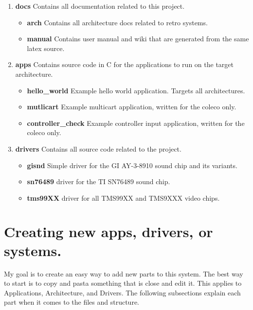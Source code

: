\documentclass{article}
\begin{document}
  \begin{enumerate}
    \item \textbf{docs} Contains all documentation related to this project.
      \begin{itemize}
        \item \textbf{arch} Contains all architecture docs related to retro systems.
        \item \textbf{manual} Contains user manual and wiki that are generated from the same latex source.
      \end{itemize}
    \item \textbf{apps} Contains source code in C for the applications to run on the target architecture.
      \begin{itemize}
        \item \textbf{hello\_world} Example hello world application. Targets all architectures.
        \item \textbf{mutlicart} Example multicart application, written for the coleco only.
        \item \textbf{controller\_check} Example controller input application, written for the coleco only.
      \end{itemize}
    \item \textbf{drivers} Contains all source code related to the project.
      \begin{itemize}
        \item \textbf{gisnd} Simple driver for the GI AY-3-8910 sound chip and its variants.
        \item \textbf{sn76489} driver for the TI SN76489 sound chip.
        \item \textbf{tms99XX} driver for all TMS99XX and TMS9XXX video chips.
      \end{itemize}
  \end{enumerate}

  \newpage

  \section{Creating new apps, drivers, or systems.}

  \par
  My goal is to create an easy way to add new parts to this system. The best way to start is to copy and pasta something
  that is close and edit it. This applies to Applications, Architecture, and Drivers. The following subsections explain each
  part when it comes to the files and structure.
\end{document}
